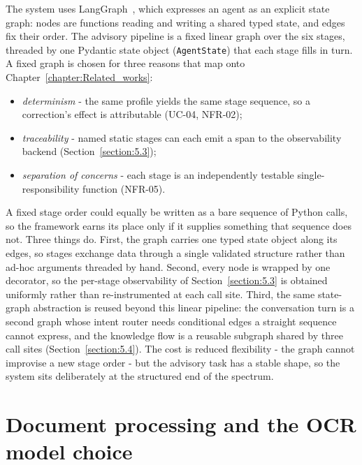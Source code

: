 \documentclass[../main.tex]{subfiles}
\begin{document}
The system uses LangGraph~\cite{langgraph, langgraph_docs}, which expresses an agent as an explicit state graph: nodes are functions reading and writing a shared typed state, and edges fix their order.
The advisory pipeline is a fixed linear graph over the six stages, threaded by one Pydantic state object (\texttt{AgentState}) that each stage fills in turn.
A fixed graph is chosen for three reasons that map onto Chapter~\ref{chapter:Related_works}:

\begin{itemize}
    \item \textit{determinism} - the same profile yields the same stage sequence, so a correction's effect is attributable (UC-04, NFR-02);
    \item \textit{traceability} - named static stages can each emit a span to the observability backend (Section~\ref{section:5.3});
    \item \textit{separation of concerns} - each stage is an independently testable single-responsibility function (NFR-05).
\end{itemize}

A fixed stage order could equally be written as a bare sequence of Python calls, so the framework earns its place only if it supplies something that sequence does not.
Three things do.
First, the graph carries one typed state object along its edges, so stages exchange data through a single validated structure rather than ad-hoc arguments threaded by hand.
Second, every node is wrapped by one decorator, so the per-stage observability of Section~\ref{section:5.3} is obtained uniformly rather than re-instrumented at each call site.
Third, the same state-graph abstraction is reused beyond this linear pipeline: the conversation turn is a second graph whose intent router needs conditional edges a straight sequence cannot express, and the knowledge flow is a reusable subgraph shared by three call sites (Section~\ref{section:5.4}).
The cost is reduced flexibility - the graph cannot improvise a new stage order - but the advisory task has a stable shape, so the system sits deliberately at the structured end of the spectrum.

\section{Document processing and the OCR model choice}
\label{section:3.4}
\end{document}
